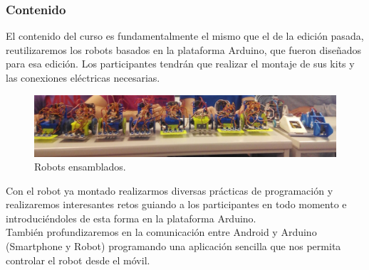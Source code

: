 \documentclass[12pt,twoside]{report}
\begin{document}
\subsubsection{Contenido}
El contenido del curso es fundamentalmente el mismo que el de la edición pasada, reutilizaremos los robots basados en la plataforma Arduino, que fueron diseñados para esa edición. Los participantes tendrán que realizar el montaje de sus kits y las conexiones eléctricas necesarias. \\
\begin{figure}[hbtp]
\centerline{\includegraphics[width=1\linewidth]{fotos/robots_ArduParty.jpg}}
\caption*{
Robots ensamblados.
}
\end{figure}
Con el robot ya montado realizarmos diversas prácticas de programación y realizaremos interesantes retos guiando a los participantes en todo momento e introduciéndoles de esta forma en la plataforma Arduino.\\
También profundizaremos en la comunicación entre Android y Arduino (Smartphone y Robot) programando una aplicación sencilla que nos permita controlar el robot desde el móvil.
\end{document}
